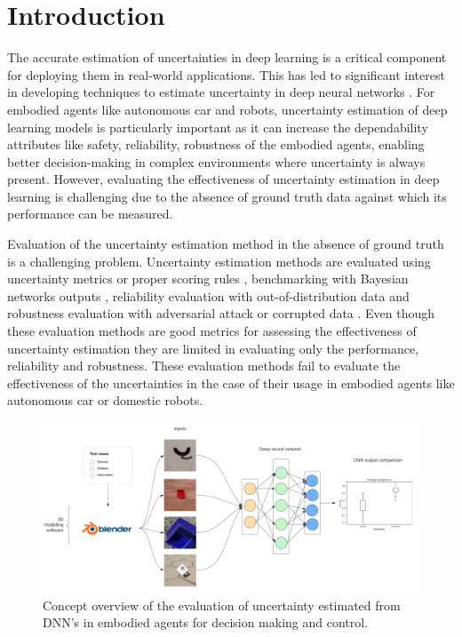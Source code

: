 
\hypertarget{sec:intro}{%
\section{Introduction}\label{sec:intro}}

The accurate estimation of uncertainties in deep learning is a critical
component for deploying them in real-world applications. This has led to
significant interest in developing techniques to estimate uncertainty in
deep neural networks \cite{mena2021survey} \cite{abdar2021review}. For embodied agents like autonomous
car and robots, uncertainty estimation of deep learning models is
particularly important as it can increase the dependability attributes
like safety, reliability, robustness of the embodied agents, enabling
better decision-making in complex environments where uncertainty is
always present. However, evaluating the effectiveness of uncertainty
estimation in deep learning is challenging due to the absence of ground
truth data against which its performance can be measured.

Evaluation of the uncertainty estimation method in the absence of ground
truth is a challenging problem. Uncertainty estimation methods are
evaluated using uncertainty metrics or proper scoring rules \cite{lakshminarayanan2017simple} \cite{gneiting2007strictly},
benchmarking with Bayesian networks outputs \cite{wilson2022evaluating}, reliability
evaluation with out-of-distribution data  \cite{sensoy2018evidential} \cite{kristiadi2021learnable} \cite{kristiadi2020being} and robustness
evaluation with adversarial attack\cite{sensoy2018evidential} \cite{van2020uncertainty} \cite{liu2020simple}  or corrupted data \cite{joppich2022classification} \cite{hendrycks2020augmix}. Even
though these evaluation methods are good metrics for assessing the
effectiveness of uncertainty estimation they are limited in evaluating
only the performance, reliability and robustness. These evaluation
methods fail to evaluate the effectiveness of the uncertainties in the
case of their usage in embodied agents like autonomous car or domestic robots.

\begin{figure}[t]
	\centering
	\includegraphics[width=\textwidth]{images/testing_based_approach.png}
	\caption[Overview of evaluation of uncertainty estimation]{Concept overview of the evaluation of uncertainty estimated from DNN's in embodied agents for decision making and control. }
	\label{fig:overview}
\end{figure}

